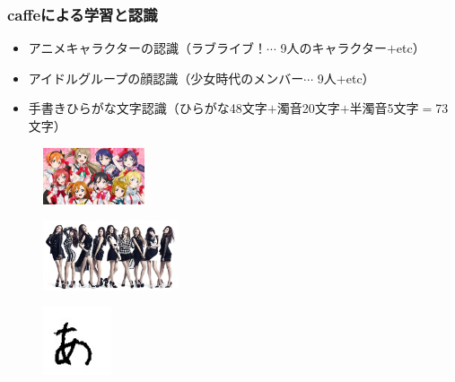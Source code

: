 \documentclass[dvipdfmx,11pt,notheorems]{beamer}
\theoremstyle{definition}
\begin{document}
\begin{frame}\frametitle{caffeによる学習と認識}
\begin{itemize}
\item アニメキャラクターの認識（ラブライブ！$\cdots$ 9人のキャラクター$+$etc）
\item アイドルグループの顔認識（少女時代のメンバー$\cdots$ 9人$+$etc）
\item 手書きひらがな文字認識（ひらがな48文字$+$濁音20文字$+$半濁音5文字$=$73文字）
\end{itemize}
\begin{figure}[t]
 \begin{minipage}{0.3\hsize}
  \centering
  \includegraphics[width=30mm]{./fig/jpg/lovelive.jpg} \\
 \end{minipage}
 \begin{minipage}{0.3\hsize}
  \centering
  \includegraphics[width=40mm]{./fig/jpg/snsd.jpg}\\
 \end{minipage}
 \begin{minipage}{0.3\hsize}
  \centering
  \includegraphics[width=20mm]{./fig/jpg/a.jpg}\\
 \end{minipage}
\end{figure}
\end{frame}
\end{document}

